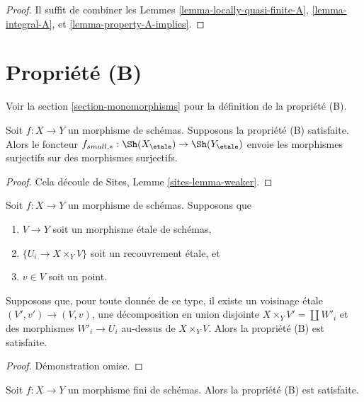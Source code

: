 \begin{proof}
Il suffit de combiner les
Lemmes \ref{lemma-locally-quasi-finite-A},
\ref{lemma-integral-A}, et
\ref{lemma-property-A-implies}.
\end{proof}



\section{Propri\'et\'e (B)}
\label{section-B}

\noindent
Voir la section \ref{section-monomorphisms} pour la d\'efinition de la propri\'et\'e
(B).

\begin{lemma}
\label{lemma-property-B-implies}
Soit $f : X \to Y$ un morphisme de sch\'emas. Supposons la propri\'et\'e (B) satisfaite.
Alors le foncteur
$f_{small, *} :
\Sh(X_\etale)
\to
\Sh(Y_\etale)$
envoie les morphismes surjectifs sur des morphismes surjectifs.
\end{lemma}

\begin{proof}
Cela d\'ecoule de
Sites, Lemme \ref{sites-lemma-weaker}.
\end{proof}

\begin{lemma}
\label{lemma-simplify-B}
Soit $f : X \to Y$ un morphisme de sch\'emas. Supposons que
\begin{enumerate}
\item $V \to Y$ soit un morphisme \'etale de sch\'emas,
\item $\{U_i \to X \times_Y V\}$ soit un recouvrement \'etale, et
\item $v \in V$ soit un point.
\end{enumerate}
Supposons que, pour toute donn\'ee de ce type, il existe un voisinage \'etale
$(V', v') \to (V, v)$, une d\'ecomposition en union disjointe
$X \times_Y V' = \coprod W'_i$ et des morphismes $W'_i \to U_i$
au-dessus de $X \times_Y V$. Alors la propri\'et\'e (B) est satisfaite.
\end{lemma}

\begin{proof}
D\'emonstration omise.
\end{proof}

\begin{lemma}
\label{lemma-finite-B}
Soit $f : X \to Y$ un morphisme fini de sch\'emas.
Alors la propri\'et\'e (B) est satisfaite.
\end{lemma}

